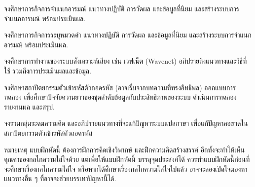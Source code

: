 \begin{Exercise}
	\label{ex: nlp sentiment analysis}
	
จงศึกษาภารกิจการจำแนกอารมณ์ แนวทางปฏิบัติ การวัดผล และข้อมูลที่นิยม
และสร้างระบบการจำแนกอารมณ์ พร้อมประเมินผล.
	
\end{Exercise}


\begin{Exercise}
	\label{ex: nlp POS}
	
จงศึกษาภารกิจการระบุหมวดคำ แนวทางปฏิบัติ การวัดผล และข้อมูลที่นิยม
และสร้างระบบการจำแนกอารมณ์ พร้อมประเมินผล.
	
	
\end{Exercise}



\begin{Exercise}
	\label{ex: seq RNN cf CNN wavenet}
	
	จงศึกษาการทำงานของระบบสังเคราะห์เสียง เช่น เวฟเน็ต (Wavenet\cite{Wavenet})
	อภิปรายถึงแนวทางและวิธีที่ใช้ รวมถึงการประเมินผลและข้อมูล.
			
\end{Exercise}

\begin{Exercise}
	\label{ex: seq encoder-decoder code length}
	
	จงศึกษาสถาปัตยกรรมตัวเข้ารหัสตัวถอดรหัส (อาจเริ่มจากบทความที่ทรงอิทธิพล\cite{ChoEtAl2014b, SutskeverEtAl2014})
	ออกแบบการทดลอง เพื่อศึกษาปัจจัยความยาวของชุดลำดับข้อมูลกับประสิทธิภาพของระบบ
	ดำเนินการทดลอง รายงานผล และสรุป.
		
\end{Exercise}

\begin{Exercise}
	\label{ex: nlp MT address limit sentence length}
	
จงรวมกลุ่มระดมความคิด และอภิปรายแนวทางที่จะแก้ปัญหาระบบแปลภาษา 
เพื่อแก้ปัญหาคอขวดในสถาปัตยกรรมตัวเข้ารหัสตัวถอดรหัส

หมายเหตุ แบบฝึกหัดนี้ ต้องการฝึกการคิดเชิงวิพากษ์ และฝึกความคิดสร้างสรรค์
อีกทั้งจะทำให้เห็นคุณค่าของกลไกความใส่ใจด้วย
แต่เพื่อให้แบบฝึกหัดนี้ บรรลุจุดประสงค์ได้ ควรทำแบบฝึกหัดนี้ก่อนที่จะศึกษาเรื่องกลไกความใส่ใจ
หรือหากได้ศึกษาเรื่องกลไกความใส่ใจไปแล้ว อาจจะลองเปิดใจมองหาแนวทางอื่น ๆ ที่อาจจะช่วยบรรเทาปัญหานี้ได้.

\end{Exercise}

